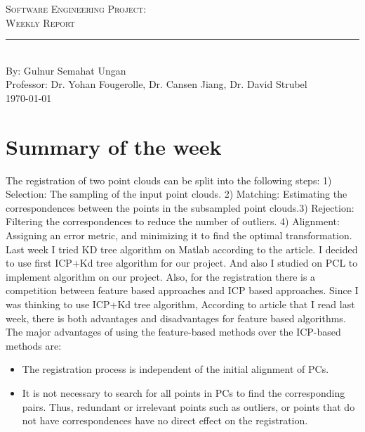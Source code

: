 \documentclass[aps,letterpaper,11pt]{revtex4}
\newcommand{\labno}{Software Engineering Project}
\newcommand{\labtitle}{Weekly Report}
\newcommand{\authorname}{Gulnur Semahat Ungan}
\newcommand{\professor}{Dr. Yohan Fougerolle, Dr. Cansen Jiang, Dr. David Strubel}
\begin{document}
  
\begin{titlepage}
\begin{center}
{\LARGE \textsc{\labno:} \\ \vspace{4pt}}
{\Large \textsc{\labtitle} \\ \vspace{4pt}} 
\rule[13pt]{\textwidth}{1pt} \\ \vspace{150pt}
{\large By: \authorname \\ \vspace{10pt}
Professor: \professor \\ \vspace{10pt}
\today}
\end{center}




\end{titlepage}%
\newpage

\section{Summary of the week}
The registration of two point clouds can be split into the following steps:  1) Selection: The sampling of the input point clouds. 2) Matching: Estimating the correspondences between the points in the subsampled point clouds.3) Rejection: Filtering the correspondences to reduce the number of outliers. 4) Alignment: Assigning an error metric, and minimizing it to find the optimal transformation. Last week I tried KD tree algorithm on Matlab according to the article. I decided to use first ICP+Kd tree algorithm  for our project. And also I studied on PCL to implement algorithm on our project. Also, for the registration there is a competition between feature based approaches and ICP based approaches. Since I was thinking to use ICP+Kd tree algorithm, According to article that I read last week, there is  both advantages and disadvantages for feature based algorithms. The major advantages of using the feature-based
methods over the ICP-based methods are:

\begin{itemize}
\item The registration process is independent of the initial
alignment of PCs.
\item  It is not necessary to search for all points in PCs to find the corresponding pairs. Thus, redundant or irrelevant points such as outliers, or points that do not have correspondences have no direct effect on the registration.
\end{itemize}
\end{document}
